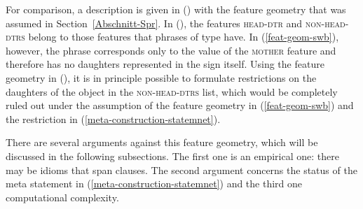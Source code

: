 \noindent
For comparison, a description is given in () with the feature geometry that was assumed in
Section~\ref{Abschnitt-Spr}.
\ea
{}
\z
In (), the features \textsc{head-dtr} and \textsc{non-head-dtrs} belong to those features that phrases of type 
 have. In (\ref{feat-geom-swb}), however, the phrase corresponds only
to the value of the \textsc{mother} feature and therefore has no daughters represented in the sign itself.
Using the feature geometry in (), it is in principle possible to formulate restrictions on the daughters of the object
in the \textsc{non-head-dtrs} list, which would be completely ruled out under the assumption of the
feature geometry in (\ref{feat-geom-swb}) and the restriction in (\ref{meta-construction-statemnet}).

There are several arguments against this feature geometry, which will be discussed in the following
subsections. The first one is an empirical one: there may be idioms that span clauses. The second
argument concerns the status of the meta statement in (\ref{meta-construction-statemnet}) and the
third one computational complexity.


